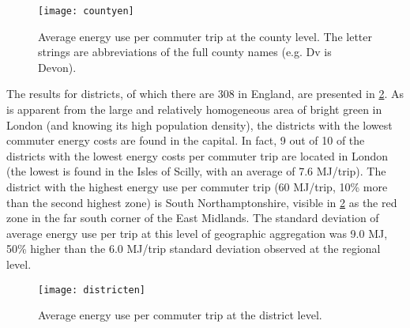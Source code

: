 \begin{figure}[htbp]
\begin{center}
    \texttt{[image: countyen]}  \end{center}
  \caption[Average energy use per commuter trip at the county level]
  {Average energy use per commuter trip at the county level. The
  letter strings are abbreviations of the full county names (e.g. Dv is Devon).}
 \label{fcountyen}
\end{figure}

The results for districts, of which there are 308 in England,
are presented in \cref{fdistricten}.
As is apparent from the large and relatively homogeneous
area of bright green in London (and
knowing its high population density), the districts with the lowest
commuter energy costs are found in the capital. In fact,
9 out of 10 of the districts with the lowest energy costs per
commuter trip are located in London (the lowest is found in the
Isles of Scilly, with an average of 7.6 MJ/trip). The district with the
highest energy use per commuter trip (60 MJ/trip, 10\% more than the second
highest zone) is South Northamptonshire, visible
in \cref{fdistricten} as the red zone in the far south corner of the
East Midlands. The standard deviation of average energy use per trip at
this level of geographic aggregation was 9.0 MJ, 50\% higher than the
6.0 MJ/trip standard deviation observed at the regional level.

\begin{figure}[htbp]
\begin{center}
    \texttt{[image: districten]}  \end{center}
  \caption[Average energy use per commuter trip at the district level]
  {Average energy use per commuter trip at the district level.}
 \label{fdistricten}
\end{figure}

